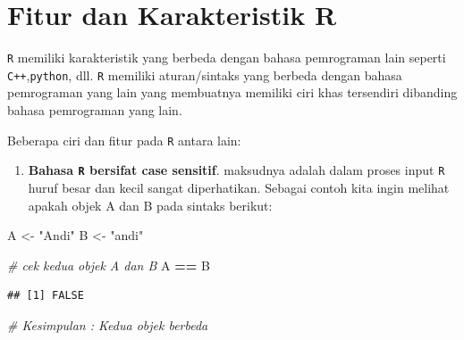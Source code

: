 \documentclass[]{book}
\newenvironment{Shaded}{\begin{snugshade}}{\end{snugshade}}
\newcommand{\StringTok}[1]{\textcolor[rgb]{0.31,0.60,0.02}{#1}}
\newcommand{\CommentTok}[1]{\textcolor[rgb]{0.56,0.35,0.01}{\textit{#1}}}
\newcommand{\OperatorTok}[1]{\textcolor[rgb]{0.81,0.36,0.00}{\textbf{#1}}}
\newcommand{\NormalTok}[1]{#1}
\providecommand{\tightlist}{%
  \setlength{\itemsep}{0pt}\setlength{\parskip}{0pt}}
\begin{document}
\section{Fitur dan Karakteristik R}\label{fitur-dan-karakteristik-r}

\texttt{R} memiliki karakteristik yang berbeda dengan bahasa pemrograman
lain seperti \texttt{C++},\texttt{python}, dll. \texttt{R} memiliki
aturan/sintaks yang berbeda dengan bahasa pemrograman yang lain yang
membuatnya memiliki ciri khas tersendiri dibanding bahasa pemrograman
yang lain.

Beberapa ciri dan fitur pada \texttt{R} antara lain:

\begin{enumerate}
\def\labelenumi{\arabic{enumi}.}
\tightlist
\item
  \textbf{Bahasa \texttt{R} bersifat case sensitif}. maksudnya adalah
  dalam proses input \texttt{R} huruf besar dan kecil sangat
  diperhatikan. Sebagai contoh kita ingin melihat apakah objek A dan B
  pada sintaks berikut:
\end{enumerate}

\begin{Shaded}
\begin{Highlighting}[]
\NormalTok{A <-}\StringTok{ "Andi"}
\NormalTok{B <-}\StringTok{ "andi"}

\CommentTok{# cek kedua objek A dan B}
\NormalTok{A }\OperatorTok{==}\StringTok{ }\NormalTok{B}
\end{Highlighting}
\end{Shaded}

\begin{verbatim}
## [1] FALSE
\end{verbatim}

\begin{Shaded}
\begin{Highlighting}[]
\CommentTok{# Kesimpulan : Kedua objek berbeda}
\end{Highlighting}
\end{Shaded}
\end{document}
